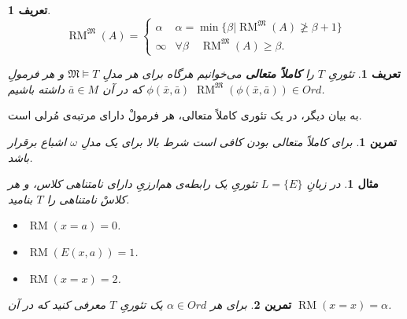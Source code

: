 \documentclass[12pt,a4paper]{report}
\theoremstyle{colorhead}
\newtheorem{tam}{تمرین}
\newtheorem{mesal}[thm]{مثال}
\newtheorem{defn}[thm]{تعریف}
\DeclareMathOperator{\RM}{RM}
\begin{document}
\begin{defn}
\[
\RM^\mathfrak{M}(A)=\begin{cases}
\alpha & \alpha=\min\{\beta|\RM^\mathfrak{M}(A)\not\geq \beta+1\}
\\
\infty & \forall\beta \quad \RM^\mathfrak{M}(A)\geq \beta.
\end{cases}
\]
\end{defn}
\begin{defn}
تئوریِ
$T$
را
\textbf{ کاملاً متعالی}
  می‌خوانیم هرگاه برای هر مدلِ
$\mathfrak{M}\models T$
و هر
فرمولِ
$\phi(\bar{x},\bar{a})$
که در آن
$\bar{a}\in M$
داشته باشیم
$\RM^\mathfrak{M}(\phi(\bar{x},\bar{a}))\in Ord$.
\end{defn}
به بیان دیگر، در یک تئوری کاملاً متعالی، هر فرمولْ دارای مرتبه‌ی مُرلی است. 
\begin{tam}
برای کاملاً متعالی بودن
کافی است شرط بالا برای یک مدلِ
$\omega$
اشباع 
برقرار باشد.
\end{tam}
\begin{mesal}
در زبانِ
$L=\{E\}$
تئوریِ
یک رابطه‌ی هم‌ارزیِ دارای نامتناهی کلاس، و هر کلاسْ نامتناهی را 
$T$
بنامید. 
\begin{itemize}
\item 
$\RM(x=a)=0$.
\item 
$\RM(E(x,a))=1$.
\item 
$\RM(x=x)=2$.
\end{itemize}
\end{mesal}
\begin{tam}
برای هر
$\alpha\in Ord$
یک تئوریِ
$T$
معرفی کنید که در آن
$\RM(x=x)=\alpha$.
\end{tam}
\pagebreak
\end{document}
